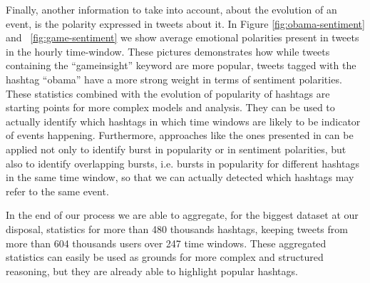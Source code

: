 Finally, another information to take into account, about the evolution of an event, is the polarity expressed in tweets about it.
In Figure \ref{fig:obama-sentiment} and ~\ref{fig:game-sentiment} we show average emotional polarities present in tweets in the hourly time-window.
These pictures demonstrates how while tweets containing the ``gameinsight'' keyword are more popular, tweets tagged with the hashtag ``obama'' have a more strong weight in terms of sentiment polarities.
These statistics combined with the evolution of popularity of hashtags are starting points for more complex models and analysis.
They can be used to actually identify which hashtags in which time windows are likely to be indicator of events happening.
Furthermore, approaches like the ones presented in \cite{Vlachos:2004:ISP:1007568.1007586} can be applied not only to identify burst in popularity or in sentiment polarities, but also to identify overlapping bursts, i.e. bursts in popularity for different hashtags in the same time window, so that we can actually detected which hashtags may refer to the same event.

In the end of our process we are able to aggregate, for the biggest dataset at our disposal, statistics for  more than 480 thousands hashtags, keeping tweets from more than 604 thousands users over 247 time windows.
These aggregated statistics can easily be used as grounds for more complex and structured reasoning, but they are already able to highlight popular hashtags.




